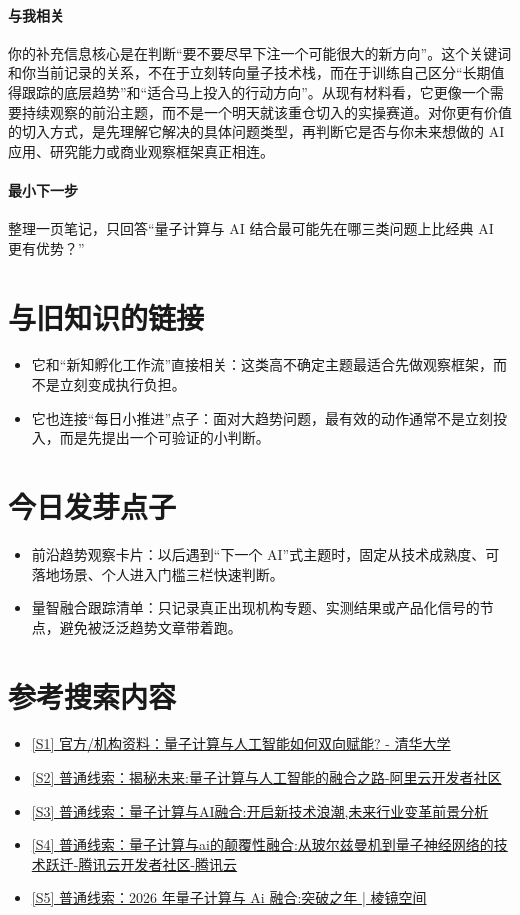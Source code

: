 \documentclass[UTF8,zihao=-4]{ctexart}
\begin{document}
\paragraph{与我相关} 你的补充信息核心是在判断“要不要尽早下注一个可能很大的新方向”。这个关键词和你当前记录的关系，不在于立刻转向量子技术栈，而在于训练自己区分“长期值得跟踪的底层趋势”和“适合马上投入的行动方向”。从现有材料看，它更像一个需要持续观察的前沿主题，而不是一个明天就该重仓切入的实操赛道。对你更有价值的切入方式，是先理解它解决的具体问题类型，再判断它是否与你未来想做的 AI 应用、研究能力或商业观察框架真正相连。
\paragraph{最小下一步} 整理一页笔记，只回答“量子计算与 AI 结合最可能先在哪三类问题上比经典 AI 更有优势？”
\section*{与旧知识的链接}
\begin{itemize}[leftmargin=2em]
\item 它和“新知孵化工作流”直接相关：这类高不确定主题最适合先做观察框架，而不是立刻变成执行负担。
\item 它也连接“每日小推进”点子：面对大趋势问题，最有效的动作通常不是立刻投入，而是先提出一个可验证的小判断。
\end{itemize}
\section*{今日发芽点子}
\begin{itemize}[leftmargin=2em]
\item 前沿趋势观察卡片：以后遇到“下一个 AI”式主题时，固定从技术成熟度、可落地场景、个人进入门槛三栏快速判断。
\item 量智融合跟踪清单：只记录真正出现机构专题、实测结果或产品化信号的节点，避免被泛泛趋势文章带着跑。
\end{itemize}
\section*{参考搜索内容}
\begin{itemize}[leftmargin=2em]
\item \href{https://www.tsinghua.edu.cn/info/1182/119522.htm}{[S1] 官方/机构资料：量子计算与人工智能如何双向赋能? - 清华大学}
\item \href{https://developer.aliyun.com/article/1564298}{[S2] 普通线索：揭秘未来:量子计算与人工智能的融合之路-阿里云开发者社区}
\item \href{https://www.sohu.com/a/921175032_121924584}{[S3] 普通线索：量子计算与AI融合:开启新技术浪潮,未来行业变革前景分析}
\item \href{https://cloud.tencent.com/developer/article/2511715}{[S4] 普通线索：量子计算与ai的颠覆性融合:从玻尔兹曼机到量子神经网络的技术跃迁-腾讯云开发者社区-腾讯云}
\item \href{https://pengjiyuan.github.io/articles/quantum-ai-2026/}{[S5] 普通线索：2026 年量子计算与 Ai 融合:突破之年 | 棱镜空间}
\end{itemize}
\end{document}
